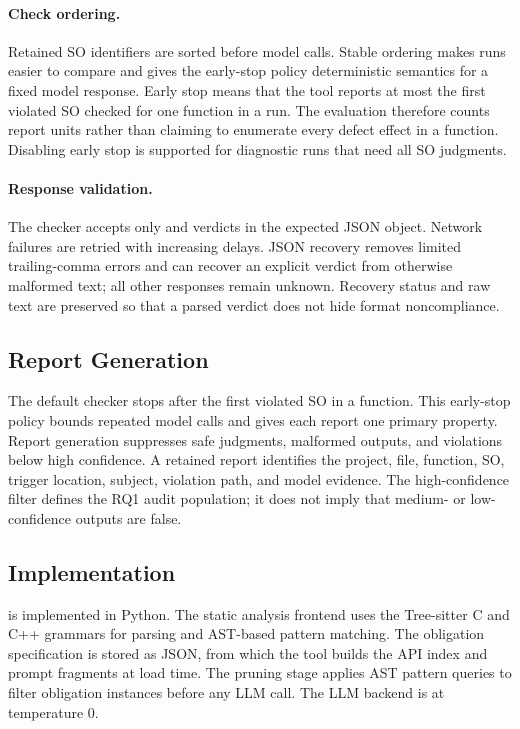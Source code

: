 \paragraph{Check ordering.}
Retained SO identifiers are sorted before model calls. Stable ordering makes
runs easier to compare and gives the early-stop policy deterministic semantics
for a fixed model response. Early stop means that the tool reports at most the
first violated SO checked for one function in a run. The evaluation therefore
counts report units rather than claiming to enumerate every defect effect in a
function. Disabling early stop is supported for diagnostic runs that need all
SO judgments.

\paragraph{Response validation.}
The checker accepts only  and  verdicts in the
expected JSON object. Network failures are retried with increasing delays.
JSON recovery removes limited trailing-comma errors and can recover an explicit
verdict from otherwise malformed text; all other responses remain unknown.
Recovery status and raw text are preserved so that a parsed verdict does not
hide format noncompliance.

\subsection{Report Generation}

The default checker stops after the first violated SO in a function. This
early-stop policy bounds repeated model calls and gives each report one primary
property. Report generation suppresses safe judgments, malformed outputs, and
violations below high confidence. A retained report identifies the project,
file, function, SO, trigger location, subject, violation path, and model
evidence. The high-confidence filter defines the RQ1 audit population; it does
not imply that medium- or low-confidence outputs are false.

\subsection{Implementation}

\tool is implemented in Python. The static analysis frontend uses the
Tree-sitter C and C++ grammars for parsing and AST-based pattern matching.
The obligation specification is stored as JSON, from which the tool builds
the API index and prompt fragments at load time. The pruning stage applies
AST pattern queries to filter obligation instances before any LLM call.
The LLM backend is  at temperature 0.
